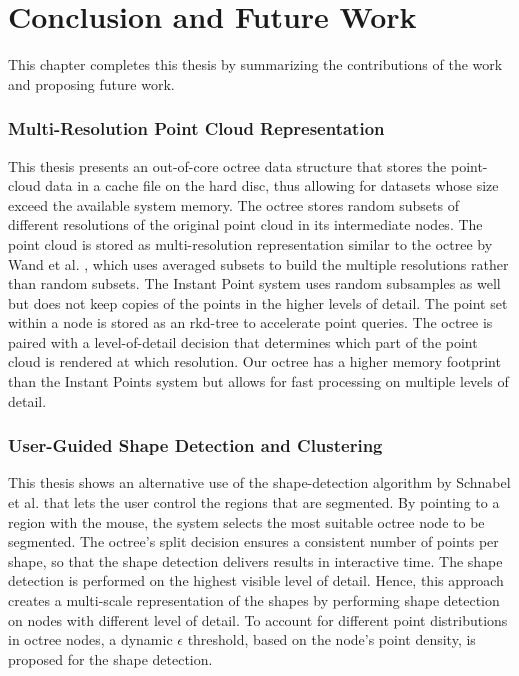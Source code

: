 \chapter{Conclusion and Future Work}
\label{chap:conclusion}


This chapter completes this thesis by summarizing the contributions of the work and proposing future work.

\subsection*{Multi-Resolution Point Cloud Representation}

This thesis presents an out-of-core octree data structure that stores the point-cloud data in a cache file on the hard disc, thus allowing for datasets whose size exceed the available system memory. The octree stores random subsets of different resolutions of the original point cloud in its intermediate nodes. The point cloud is stored as multi-resolution representation similar to the octree by Wand et al. \cite{wand2007interactive}, which uses averaged subsets to build the multiple resolutions rather than random subsets. The Instant Point system \cite{wimmer2006instant} uses random subsamples as well but does not keep copies of the points in the higher levels of detail. The point set within a node is stored as an rkd-tree \cite{tobler2011rkd} to accelerate point queries. The octree is paired with a level-of-detail decision that determines which part of the point cloud is rendered at which resolution. Our octree has a higher memory footprint than the Instant Points system but allows for fast processing on multiple levels of detail. 


\subsection*{User-Guided Shape Detection and Clustering}

This thesis shows an alternative use of the shape-detection algorithm by Schnabel et al. \cite{schnabel-2007-efficient} that lets the user control the regions that are segmented. By pointing to a region with the mouse, the system selects the most suitable octree node to be segmented. The octree's split decision ensures a consistent number of points per shape, so that the shape detection delivers results in interactive time. The shape detection is performed on the highest visible level of detail. Hence, this approach creates a multi-scale representation of the shapes by performing shape detection on nodes with different level of detail. To account for different point distributions in octree nodes, a dynamic $\epsilon$ threshold, based on the node's point density, is proposed for the shape detection. 

